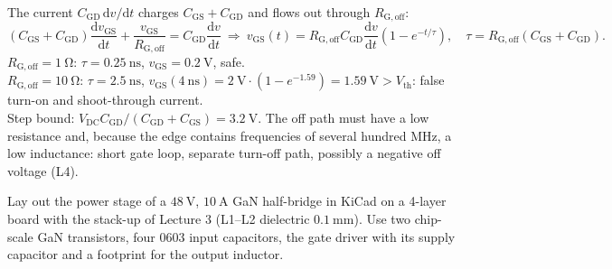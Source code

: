 


\begin{solutionblock}
	The current $C_\mathrm{GD}\,\mathrm{d}v/\mathrm{d}t$ charges $C_\mathrm{GS}+C_\mathrm{GD}$ and flows out through $R_\mathrm{G,off}$:
	\begin{equation}
		(C_\mathrm{GS}+C_\mathrm{GD})\frac{\mathrm{d}v_\mathrm{GS}}{\mathrm{d}t}+\frac{v_\mathrm{GS}}{R_\mathrm{G,off}}=C_\mathrm{GD}\frac{\mathrm{d}v}{\mathrm{d}t}
		\ \Rightarrow\ v_\mathrm{GS}(t)=R_\mathrm{G,off}C_\mathrm{GD}\frac{\mathrm{d}v}{\mathrm{d}t}\left(1-e^{-t/\tau}\right),\quad\tau=R_\mathrm{G,off}(C_\mathrm{GS}+C_\mathrm{GD}).
	\end{equation}
	$R_\mathrm{G,off}=\SI{1}{\ohm}$: $\tau=\SI{0.25}{\nano\second}$, $v_\mathrm{GS}=\SI{0.2}{\volt}$, safe.\\
	$R_\mathrm{G,off}=\SI{10}{\ohm}$: $\tau=\SI{2.5}{\nano\second}$, $v_\mathrm{GS}(\SI{4}{\nano\second})=\SI{2}{\volt}\cdot(1-e^{-1.59})=\SI{1.59}{\volt}>V_\mathrm{th}$: false turn-on and shoot-through current.\\
	Step bound: $V_\mathrm{DC}C_\mathrm{GD}/(C_\mathrm{GD}+C_\mathrm{GS})=\SI{3.2}{\volt}$. The off path must have a low resistance and, because the edge contains frequencies of several hundred MHz, a low inductance: short gate loop, separate turn-off path, possibly a negative off voltage (L4).
\end{solutionblock}



Lay out the power stage of a $\SI{48}{\volt}$, $\SI{10}{\ampere}$ GaN half-bridge in KiCad on a 4-layer board with the stack-up of Lecture 3 (L1--L2 dielectric $\SI{0.1}{\milli\metre}$). Use two chip-scale GaN transistors, four 0603 input capacitors, the gate driver with its supply capacitor and a footprint for the output inductor.

